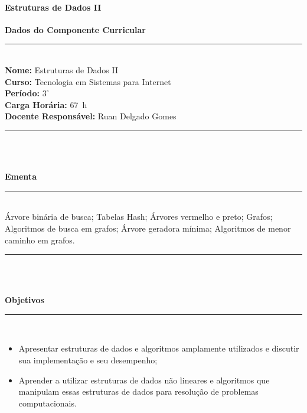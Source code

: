 \paragraph{Estruturas de Dados II}

\begin{center}\textbf{Dados do Componente Curricular}\end{center}
\vspace{-5mm}
\noindent\rule{16.5cm}{0.4pt}
\\
\textbf{Nome:} Estruturas de Dados II
\\ 
\textbf{Curso:} Tecnologia em Sistemas para Internet
\\ 
\textbf{Período:} $3^{\circ}$
\\ 
\textbf{Carga Horária:} 67~h
\\ 
\textbf{Docente Responsável:} Ruan Delgado Gomes
\\ 
\noindent\rule{16.5cm}{0.4pt}\\
\\
\vspace{-12mm}
\begin{center}\textbf{Ementa}\end{center}
\vspace{-5mm}
\noindent\rule{16.5cm}{0.4pt}
\\
\'Arvore bin\'aria de busca; Tabelas Hash; \'Arvores vermelho e preto; Grafos; Algoritmos de busca em grafos; \'Arvore geradora m\'inima; Algoritmos de menor caminho em grafos.\\ 
\noindent\rule{16.5cm}{0.4pt}\\
\\
\vspace{-12mm}
\begin{center}\textbf{Objetivos}\end{center}
\vspace{-5mm}
\noindent\rule{16.5cm}{0.4pt}
\\
\begin{itemize}
\item Apresentar estruturas de dados e algoritmos amplamente utilizados e discutir sua implementação e seu desempenho;
\item Aprender a utilizar estruturas de dados n\~ao lineares e algoritmos que manipulam essas estruturas de dados para resolu\c{c}\~ao de problemas computacionais.
\end{itemize} 
